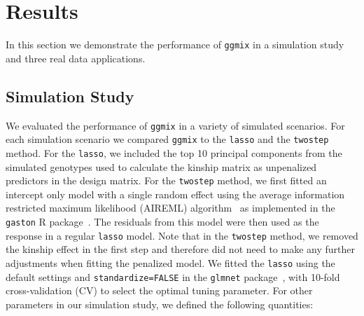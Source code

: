 \documentclass[12pt,letter]{article}\usepackage[]{graphicx}\usepackage[]{color}
\begin{document}
\FloatBarrier



\section{Results}\label{sec:results}

In this section we demonstrate the performance of \texttt{ggmix} in a simulation study and three real data applications. 
\subsection{Simulation Study} \label{simustudy}

We evaluated the performance of \texttt{ggmix} in a variety of simulated scenarios. For each simulation scenario we compared \texttt{ggmix} to the \texttt{lasso} and the \texttt{twostep} method. For the \texttt{lasso}, we included the top 10 principal components from the simulated genotypes used to calculate the kinship matrix as unpenalized predictors in the design matrix. For the \texttt{twostep} method, we first fitted an intercept only model with a single random effect using the average information restricted maximum likelihood (AIREML) algorithm~\citep{gilmour1995average} as implemented in the \texttt{gaston} R package~\citep{gaston}. The residuals from this model were then used as the response in a regular \texttt{lasso} model. Note that in the \texttt{twostep} method, we removed the kinship effect in the first step and therefore did not need to make any further adjustments when fitting the penalized model. We fitted the \texttt{lasso} using the default settings and \texttt{standardize=FALSE} in the \texttt{glmnet} package~\citep{friedman2010regularization}, with 10-fold cross-validation (CV) to select the optimal tuning parameter. For other parameters in our simulation study, we defined the following quantities:
\end{document}
